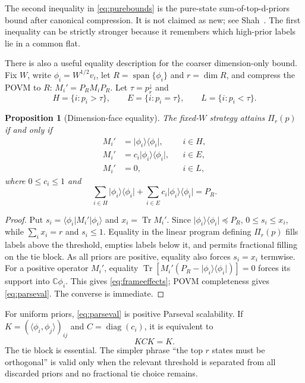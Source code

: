 \documentclass[11pt]{article}
\newtheorem{proposition}[theorem]{Proposition}
\theoremstyle{definition}
\theoremstyle{remark}
\newcommand{\C}{\mathbb C}
\newcommand{\Span}{\operatorname{span}}
\newcommand{\Tr}{\operatorname{Tr}}
\newcommand{\ket}[1]{\lvert #1\rangle}
\newcommand{\bra}[1]{\langle #1\rvert}
\begin{document}
The second inequality in \cref{eq:purebounds} is the pure-state
sum-of-top-d-priors bound after canonical compression.  It is not claimed as
new; see Shah~\cite{shah2025}.  The first inequality can be strictly stronger
because it remembers which high-prior labels lie in a common flat.

There is also a useful equality description for the coarser dimension-only
bound.  Fix $W$, write
$\phi_i=W^{1/2}v_i$, let $R=\Span\{\phi_i\}$ and $r=\dim R$, and compress
the POVM to $R$: $M_i'=P_RM_iP_R$.  Let
$\tau=p_r^\downarrow$ and
\[
 H=\{i:p_i>\tau\},\qquad
 E=\{i:p_i=\tau\},\qquad
 L=\{i:p_i<\tau\}.
\]

\begin{proposition}[Dimension-face equality]\label{prop:frame}
The fixed-$W$ strategy attains $\Pi_r(p)$ if and only if
\begin{equation}
 \begin{aligned}
  M_i'&=\ket{\phi_i}\!\bra{\phi_i}, &&i\in H,\\
  M_i'&=c_i\ket{\phi_i}\!\bra{\phi_i}, &&i\in E,\\
  M_i'&=0, &&i\in L,
 \end{aligned}                                           \label{eq:frameeffects}
\end{equation}
where $0\leq c_i\leq1$ and
\begin{equation}
 \sum_{i\in H}\ket{\phi_i}\!\bra{\phi_i}
 +\sum_{i\in E}c_i\ket{\phi_i}\!\bra{\phi_i}=P_R.    \label{eq:parseval}
\end{equation}
\end{proposition}

\begin{proof}
Put $s_i=\bra{\phi_i}M_i'\ket{\phi_i}$ and $x_i=\Tr M_i'$.  Since
$\ket{\phi_i}\!\bra{\phi_i}\preceq P_R$,
$0\leq s_i\leq x_i$, while $\sum_i x_i=r$ and $s_i\leq1$.  Equality in the
linear program defining $\Pi_r(p)$ fills labels above the threshold, empties
labels below it, and permits fractional filling on the tie block.  As all
priors are positive, equality also forces $s_i=x_i$ termwise.  For a positive
operator $M_i'$, equality
$\Tr[M_i'(P_R-\ket{\phi_i}\!\bra{\phi_i})]=0$ forces its support into
$\C\phi_i$.  This gives \cref{eq:frameeffects}; POVM completeness gives
\cref{eq:parseval}.  The converse is immediate.
\end{proof}

For uniform priors, \cref{eq:parseval} is positive Parseval scalability.  If
$K=(\langle\phi_i,\phi_j\rangle)_{ij}$ and
$C=\operatorname{diag}(c_i)$, it is equivalent to
\begin{equation}
                              KCK=K.                     \label{eq:kck}
\end{equation}
The tie block is essential.  The simpler phrase ``the top $r$ states must be
orthogonal'' is valid only when the relevant threshold is separated from all
discarded priors and no fractional tie choice remains.
\end{document}
